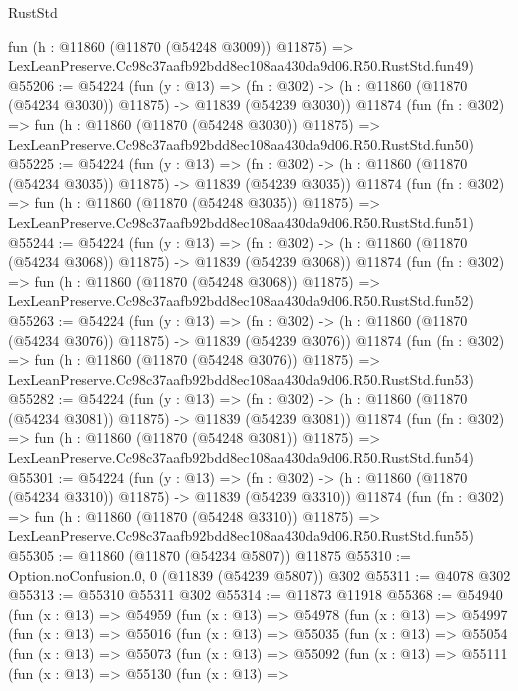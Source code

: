 \begin{lexlean}{RustStd}
\begin{coremodule}
    fun (h : @11860 (@11870 (@54248 @3009)) @11875) =>
    LexLeanPreserve.Cc98c37aafb92bdd8ec108aa430da9d06.R50.RustStd.fun49)
@55206 := @54224
    (fun (y : @13) =>
    (fn : @302) -> (h : @11860 (@11870 (@54234 @3030)) @11875) -> @11839 (@54239 @3030))
    @11874
    (fun (fn : @302) =>
    fun (h : @11860 (@11870 (@54248 @3030)) @11875) =>
    LexLeanPreserve.Cc98c37aafb92bdd8ec108aa430da9d06.R50.RustStd.fun50)
@55225 := @54224
    (fun (y : @13) =>
    (fn : @302) -> (h : @11860 (@11870 (@54234 @3035)) @11875) -> @11839 (@54239 @3035))
    @11874
    (fun (fn : @302) =>
    fun (h : @11860 (@11870 (@54248 @3035)) @11875) =>
    LexLeanPreserve.Cc98c37aafb92bdd8ec108aa430da9d06.R50.RustStd.fun51)
@55244 := @54224
    (fun (y : @13) =>
    (fn : @302) -> (h : @11860 (@11870 (@54234 @3068)) @11875) -> @11839 (@54239 @3068))
    @11874
    (fun (fn : @302) =>
    fun (h : @11860 (@11870 (@54248 @3068)) @11875) =>
    LexLeanPreserve.Cc98c37aafb92bdd8ec108aa430da9d06.R50.RustStd.fun52)
@55263 := @54224
    (fun (y : @13) =>
    (fn : @302) -> (h : @11860 (@11870 (@54234 @3076)) @11875) -> @11839 (@54239 @3076))
    @11874
    (fun (fn : @302) =>
    fun (h : @11860 (@11870 (@54248 @3076)) @11875) =>
    LexLeanPreserve.Cc98c37aafb92bdd8ec108aa430da9d06.R50.RustStd.fun53)
@55282 := @54224
    (fun (y : @13) =>
    (fn : @302) -> (h : @11860 (@11870 (@54234 @3081)) @11875) -> @11839 (@54239 @3081))
    @11874
    (fun (fn : @302) =>
    fun (h : @11860 (@11870 (@54248 @3081)) @11875) =>
    LexLeanPreserve.Cc98c37aafb92bdd8ec108aa430da9d06.R50.RustStd.fun54)
@55301 := @54224
    (fun (y : @13) =>
    (fn : @302) -> (h : @11860 (@11870 (@54234 @3310)) @11875) -> @11839 (@54239 @3310))
    @11874
    (fun (fn : @302) =>
    fun (h : @11860 (@11870 (@54248 @3310)) @11875) =>
    LexLeanPreserve.Cc98c37aafb92bdd8ec108aa430da9d06.R50.RustStd.fun55)
@55305 := @11860 (@11870 (@54234 @5807)) @11875
@55310 := Option.noConfusion.{0, 0} (@11839 (@54239 @5807)) @302
@55311 := @4078 @302
@55313 := @55310 @55311 @302
@55314 := @11873 @11918
@55368 := @54940
    (fun (x : @13) =>
    @54959
      (fun (x : @13) =>
      @54978
        (fun (x : @13) =>
        @54997
          (fun (x : @13) =>
          @55016
            (fun (x : @13) =>
            @55035
              (fun (x : @13) =>
              @55054
                (fun (x : @13) =>
                @55073
                  (fun (x : @13) =>
                  @55092
                    (fun (x : @13) =>
                    @55111
                      (fun (x : @13) =>
                      @55130
                        (fun (x : @13) =>

\end{coremodule}
\end{lexlean}
